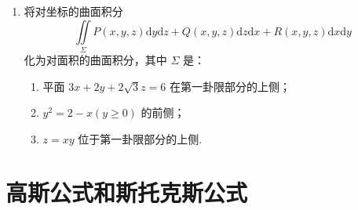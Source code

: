 \begin{enumerate}
    \item 将对坐标的曲面积分
    \[
        \iint\limits_{\Sigma}P(x, y, z)\text{d}y\text{d}z+Q(x, y, z)\text{d}z\text{d}x+R(x, y, z)\text{d}x\text{d}y
    \]
    化为对面积的曲面积分，其中 $\Sigma$ 是：
    \begin{enumerate}[(1)]\setlength{\itemsep}{5pt}\setlength{\topsep}{15pt}
        \item 平面 $3x+2y+2\sqrt{3}z=6$ 在第一卦限部分的上侧；
        \item $y^2=2-x(y\geqslant0)$ 的前侧；
        \item $z=xy$ 位于第一卦限部分的上侧.
    \end{enumerate}
\end{enumerate}

\section{高斯公式和斯托克斯公式}

